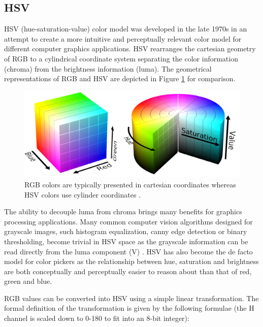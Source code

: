 \documentclass[thesis.tex]{subfiles}
\begin{document}
\subsection{HSV}

HSV (hue-saturation-value) color model was developed in the late 1970s in an attempt to create a more intuitive and perceptually relevant color model for different computer graphics applications. HSV rearranges the cartesian geometry of RGB to a cylindrical coordinate system separating the color information (chroma) from the brightness information (luma). The geometrical representations of RGB and HSV are depicted in Figure \ref{figure:rgb_hsv} for comparison.

\begin{figure}[ht]
\centering \includegraphics[width=\textwidth]{images/rgb_hsv}
\caption{RGB colors are typically presented in cartesian coordinates whereas HSV colors use cylinder coordinates \cite{hsv_cylinder}\cite{rgb_cube}.\label{figure:rgb_hsv}}
\end{figure}

The ability to decouple luma from chroma brings many benefits for graphics processing applications. Many common computer vision algorithms designed for grayscale images, such histogram equalization, canny edge detection or binary thresholding, become trivial in HSV space as the grayscale information can be read directly from the luma component (V) \cite{color_segmentation}. HSV has also become the de facto model for color pickers as the relationship between hue, saturation and brightness are both conceptually and perceptually easier to reason about than that of red, green and blue.

RGB values can be converted into HSV using a simple linear transformation. The formal definition of the transformation is given by the following formulae (the H channel is scaled down to 0-180 to fit into an 8-bit integer):
\end{document}
